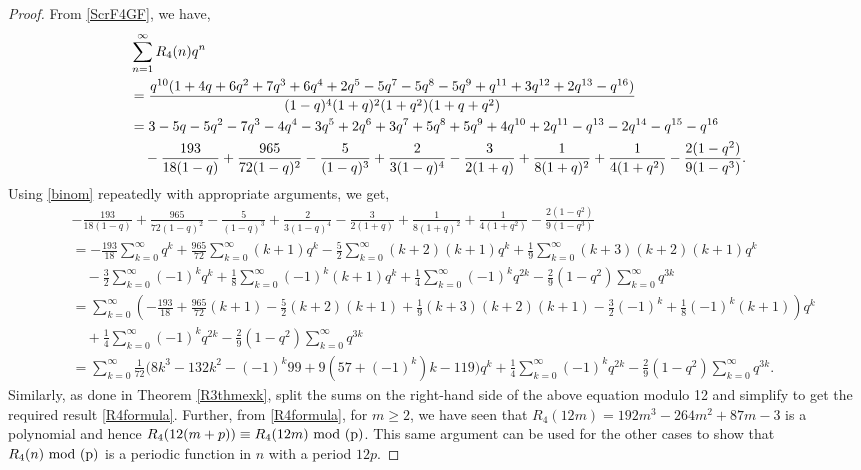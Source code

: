 \documentclass[12pt,reqno]{amsart}
\numberwithin{equation}{section}
\theoremstyle{plain}
\begin{document}
	\begin{proof}
		From \eqref{ScrF4GF}, we have,
		\begin{align}
			&\sum_{n=1}^{\infty} R_4(n) q^n \\ &=\frac{q^{10}(1+4q+6q^2+7q^3+6q^4+2q^5-5q^7-5q^8-5q^9+q^{11}+3q^{12}+2q^{13}-q^{16})}{(1-q)^4(1+q)^2(1+q^2)(1+q+q^2)} \notag \\
			&= 3 -5q -5q^2 -7q^3 -4q^4 -3q^5 +2q^6 +3q^7 +5q^8 +5q^9 +4q^{10} +2q^{11} -q^{13} -2q^{14} -q^{15} -q^{16} \notag \\
			&\quad  - \frac{193}{18(1-q)} + \frac{965}{72(1-q)^2}- \frac{5}{(1-q)^3}+ \frac{2}{3(1-q)^4} - \frac{3}{2(1+q)} + \frac{1}{8(1+q)^2}+ \frac{1}{4(1+q^2)}- \frac{2(1-q^2)}{9(1-q^3)}. \label{4inter}
		\end{align}
		Using \eqref{binom} repeatedly with appropriate arguments, we get,
		\begin{align*}
			&-\frac{193}{18(1-q)} + \frac{965}{72(1-q)^2}- \frac{5}{(1-q)^3}+ \frac{2}{3(1-q)^4} - \frac{3}{2(1+q)} + \frac{1}{8(1+q)^2}+ \frac{1}{4(1+q^2)}- \frac{2(1-q^2)}{9(1-q^3)} \\
			&= -\frac{193}{18} \sum_{k=0}^{\infty} q^k  +\frac{965}{72} \sum_{k=0}^{\infty} (k+1) q^k -\frac{5}{2} \sum_{k=0}^{\infty} (k+2)(k+1) q^k +\frac{1}{9} \sum_{k=0}^{\infty} (k+3)(k+2)(k+1)q^k \\
			&\quad -\frac{3}{2} \sum_{k=0}^{\infty} (-1)^k q^k +\frac{1}{8} \sum_{k=0}^{\infty} (-1)^k (k+1) q^k +\frac{1}{4} \sum_{k=0}^{\infty} (-1)^k q^{2k} -\frac{2}{9} (1-q^2) \sum_{k=0}^{\infty} q^{3k} \\
			&= \sum_{k=0}^{\infty} \left( -\frac{193}{18}  +\frac{965}{72} (k+1) -\frac{5}{2}  (k+2)(k+1) +\frac{1}{9} (k+3)(k+2)(k+1)  -\frac{3}{2} (-1)^k +\frac{1}{8} (-1)^k (k+1) \right) q^k \\
			&\quad  +\frac{1}{4} \sum_{k=0}^{\infty} (-1)^k q^{2k} -\frac{2}{9} (1-q^2) \sum_{k=0}^{\infty} q^{3k} \\
			&= \sum_{k=0}^{\infty} \frac{1}{72} \bigg(8k^3 -132 k^2- (-1)^k 99+ 9(57+(-1)^k)k   -119\bigg) q^k  +\frac{1}{4} \sum_{k=0}^{\infty} (-1)^k q^{2k} -\frac{2}{9} (1-q^2) \sum_{k=0}^{\infty} q^{3k}.
		\end{align*}
		Similarly, as done in Theorem \ref{R3thmexk}, split the sums on the right-hand side of the above equation modulo 12 and simplify to get the required result \eqref{R4formula}.	 
		Further, from \eqref{R4formula}, for $m\geq2$, we have seen that $R_4(12m) = 	192m^3 -264m^2+87m-3$ is a polynomial and hence $R_4(12(m+p)) \equiv R_4(12m) \textup{ mod (p)}$. This same argument can be used for the other cases to show that $R_4(n) \textup{ mod (p)}$ is a periodic function in $n$ with a period $12p$.
	\end{proof}
\end{document}
